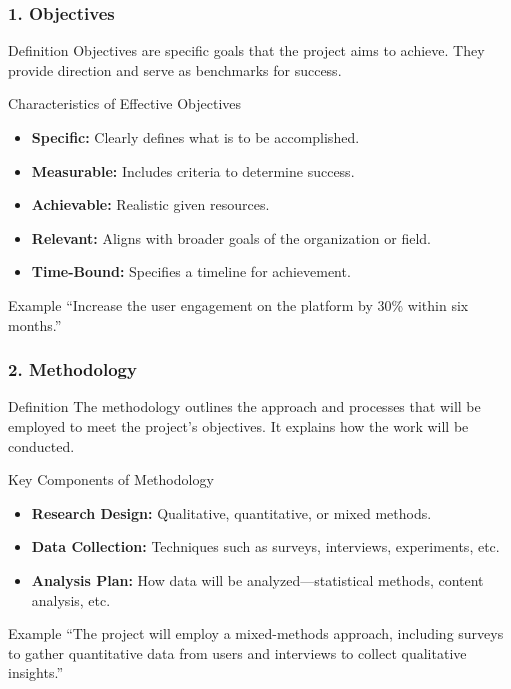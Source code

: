 \documentclass[aspectratio=169]{beamer}
\begin{document}
\begin{frame}[fragile]
    \frametitle{1. Objectives}
    \begin{block}{Definition}
        Objectives are specific goals that the project aims to achieve. They provide direction and serve as benchmarks for success.
    \end{block}
    
    \begin{block}{Characteristics of Effective Objectives}
        \begin{itemize}
            \item \textbf{Specific:} Clearly defines what is to be accomplished.
            \item \textbf{Measurable:} Includes criteria to determine success.
            \item \textbf{Achievable:} Realistic given resources.
            \item \textbf{Relevant:} Aligns with broader goals of the organization or field.
            \item \textbf{Time-Bound:} Specifies a timeline for achievement.
        \end{itemize}
    \end{block}
    
    \begin{block}{Example}
        ``Increase the user engagement on the platform by 30\% within six months.''
    \end{block}
\end{frame}

\begin{frame}[fragile]
    \frametitle{2. Methodology}
    \begin{block}{Definition}
        The methodology outlines the approach and processes that will be employed to meet the project's objectives. It explains how the work will be conducted.
    \end{block}
    
    \begin{block}{Key Components of Methodology}
        \begin{itemize}
            \item \textbf{Research Design:} Qualitative, quantitative, or mixed methods.
            \item \textbf{Data Collection:} Techniques such as surveys, interviews, experiments, etc.
            \item \textbf{Analysis Plan:} How data will be analyzed—statistical methods, content analysis, etc.
        \end{itemize}
    \end{block}
    
    \begin{block}{Example}
        ``The project will employ a mixed-methods approach, including surveys to gather quantitative data from users and interviews to collect qualitative insights.''
    \end{block}
\end{frame}
\end{document}
